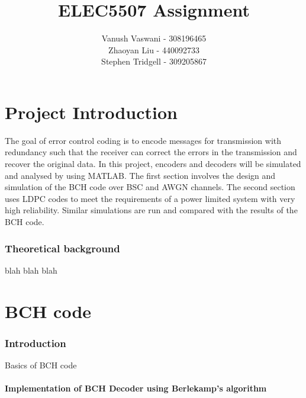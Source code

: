 \documentclass[a4paper]{article}
\begin{document}
\title{ELEC5507 Assignment}
\author{Vanush Vaswani - 308196465 \\
Zhaoyan Liu - 440092733 \\
Stephen Tridgell - 309205867}

\maketitle

\tableofcontents
\listoffigures


\lstset{language=Matlab, frame=single, breaklines=true, keepspaces=true, columns=flexible, basicstyle=\ttfamily\footnotesize}
\newpage

\part*{Project Introduction}

The goal of error control coding is to encode messages for transmission with redundancy such that the receiver can correct the errors in the transmission and recover the original data. In this project, encoders and decoders will be simulated and analysed by using MATLAB. The first section involves the design and simulation of the BCH code over BSC and AWGN channels. The second section uses LDPC codes to meet the requirements of a power limited system with very high reliability. Similar simulations are run and compared with the results of the BCH code.

\section{Theoretical background}

blah blah blah \\

\part*{BCH code}

\section{Introduction}

Basics of BCH code  \\

\subsection{Implementation of BCH Decoder using Berlekamp's algorithm}
\end{document}
